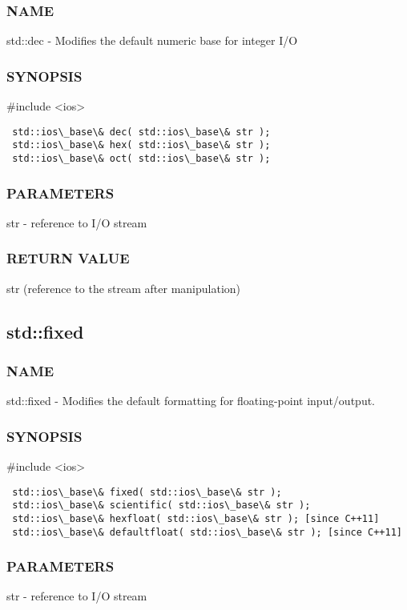 \subsubsection{NAME}
std::dec - Modifies the default numeric base for integer I/O

\subsubsection{SYNOPSIS}
\#include <ios>

\begin{lstlisting}
 std::ios\_base\& dec( std::ios\_base\& str );
 std::ios\_base\& hex( std::ios\_base\& str );
 std::ios\_base\& oct( std::ios\_base\& str );
\end{lstlisting}

\subsubsection{PARAMETERS}
str - reference to I/O stream

\subsubsection{RETURN VALUE}
str (reference to the stream after manipulation)



\subsection{std::fixed}

\subsubsection{NAME}
std::fixed - Modifies the default formatting for floating-point input/output.

\subsubsection{SYNOPSIS}
\#include <ios>

\begin{lstlisting}
 std::ios\_base\& fixed( std::ios\_base\& str );
 std::ios\_base\& scientific( std::ios\_base\& str );
 std::ios\_base\& hexfloat( std::ios\_base\& str ); [since C++11]
 std::ios\_base\& defaultfloat( std::ios\_base\& str ); [since C++11]
\end{lstlisting}

\subsubsection{PARAMETERS}
str - reference to I/O stream

